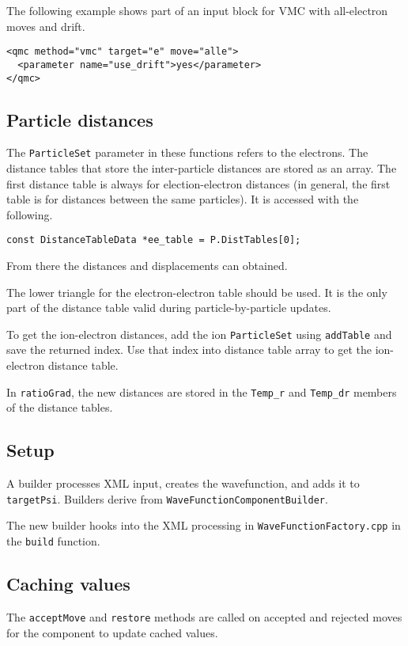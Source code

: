 The following example shows part of an input block for VMC with all-electron moves and drift.

\begin{verbatim}
<qmc method="vmc" target="e" move="alle">
  <parameter name="use_drift">yes</parameter>
</qmc>
\end{verbatim}



\subsection{Particle distances}

The \texttt{ParticleSet} parameter in these functions refers to the electrons.
The distance tables that store the inter-particle distances are stored as an array.
The first distance table is
always for election-electron distances (in general, the first table is for distances between the same particles).  It is accessed with the following.
\begin{verbatim}
const DistanceTableData *ee_table = P.DistTables[0];
\end{verbatim}
From there the distances and displacements can obtained.

The lower triangle for the electron-electron table should be used.
It is the only part of the distance table valid during particle-by-particle updates.

To get the ion-electron distances, add the ion \texttt{ParticleSet} using \texttt{addTable}
and save the returned index.
Use that index into distance table array to get the ion-electron distance table.

In \texttt{ratioGrad}, the new distances are stored in the \texttt{Temp\_r} and \texttt{Temp\_dr}
members of the distance tables.

\subsection{Setup}

A builder processes XML input, creates the wavefunction, and adds it to \texttt{targetPsi}.
Builders derive from \texttt{WaveFunctionComponentBuilder}.

The new builder hooks into the XML processing in \texttt{WaveFunctionFactory.cpp} in the \texttt{build} function.


\subsection{Caching values}
The \texttt{acceptMove} and \texttt{restore} methods are called on accepted and rejected moves for
the component to update cached values.


